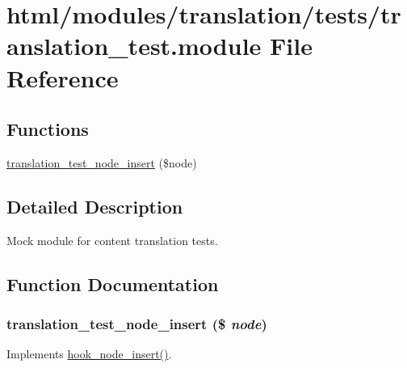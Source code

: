 \hypertarget{translation__test_8module}{
\section{html/modules/translation/tests/translation\_\-test.module File Reference}
\label{translation__test_8module}
}
\subsection*{Functions}
\begin{DoxyCompactItemize}
\item 
\hyperlink{translation__test_8module_a67fcab18e53f257deb854230344ac3c5}{translation\_\-test\_\-node\_\-insert} (\$node)
\end{DoxyCompactItemize}


\subsection{Detailed Description}
Mock module for content translation tests. 

\subsection{Function Documentation}
\hypertarget{translation__test_8module_a67fcab18e53f257deb854230344ac3c5}{
\subsubsection[{translation\_\-test\_\-node\_\-insert}]{\setlength{\rightskip}{0pt plus 5cm}translation\_\-test\_\-node\_\-insert (\$ {\em node})}}
\label{translation__test_8module_a67fcab18e53f257deb854230344ac3c5}
Implements \hyperlink{group__node__api__hooks_ga8b40dc62e46e5055c205d2a723dc3548}{hook\_\-node\_\-insert()}. 